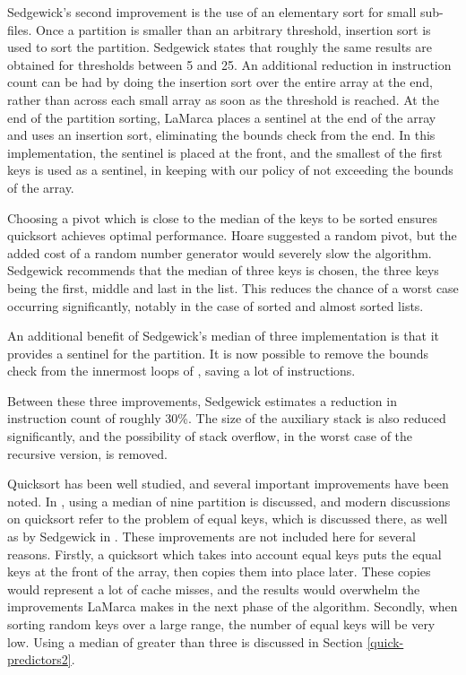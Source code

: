 Sedgewick's second improvement is the use of an elementary sort for small
sub-files.  Once a partition is smaller than an arbitrary threshold, insertion
sort is used to sort the partition. Sedgewick states that roughly the same
results are obtained for thresholds between 5 and 25. An additional reduction in
instruction count can be had by doing the insertion sort over the entire array
at the end, rather than across each small array as soon as the threshold is
reached. At the end of the partition sorting, LaMarca places a sentinel at the
end of the array and uses an insertion sort, eliminating the bounds check from
the end. In this implementation, the sentinel is placed at the front, and the
smallest of the first  keys is used as a sentinel, in keeping
with our policy of not exceeding the bounds of the array.

Choosing a pivot which is close to the median of the keys to be sorted ensures
quicksort achieves optimal performance. Hoare suggested a random pivot, but the
added cost of a random number generator would severely slow the algorithm.
Sedgewick recommends that the median of three keys is chosen, the three keys
being the first, middle and last in the list. This reduces the chance of a worst
case occurring significantly, notably in the case of sorted and almost sorted
lists.

An additional benefit of Sedgewick's median of three implementation is that it
provides a sentinel for the partition. It is now possible to remove the bounds
check from the innermost loops of , saving a lot of instructions.

Between these three improvements, Sedgewick estimates a reduction in
instruction count of roughly 30\%. The size of the auxiliary stack is also
reduced significantly, and the possibility of stack overflow, in the worst case
of the recursive version, is removed.

Quicksort has been well studied, and several important improvements have been
noted. In \cite{BentleyMcIlroy93}, using a median of nine partition is discussed,
and modern discussions on quicksort refer to the problem of equal keys, which is
discussed there, as well as by Sedgewick in \cite{SedgewickBentley02}. These
improvements are not included here for several reasons. Firstly, a quicksort
which takes into account equal keys puts the equal keys at the front of the
array, then copies them into place later. These copies would represent a lot of
cache misses, and the results would overwhelm the improvements LaMarca makes in
the next phase of the algorithm. Secondly, when sorting random keys over a
large range, the number of equal keys will be very low. Using a median of
greater than three is discussed in Section \ref{quick-predictors2}.

